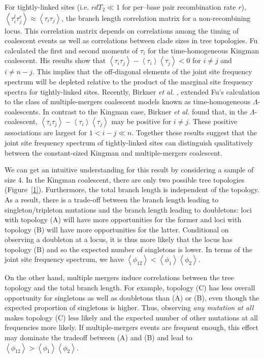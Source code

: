 \documentclass[11pt, letterpaper]{article}   	%
\newcommand{\Fig}[1]{Figure~\ref{#1}}
\newcommand{\E}[1]{\left<{#1}\right>}
\begin{document}
For tightly-linked sites (i.e. $rdT_2\ll1$ for per--base pair recombination rate $r$), $\E{\tau_i^l \tau_j^r} \approx \E{\tau_i \tau_j}$, the branch length correlation matrix for a non-recombining locus.
This correlation matrix depends on correlations among the timing of coalescent events as well as correlations between clade sizes in tree topologies.
Fu \cite{} calculated the first and second moments of $\tau_i$ for the time-homogeneous Kingman coalescent.
His results show that $\E{\tau_i \tau_j} - \E{\tau_i}\E{\tau_j} < 0$ for $i \neq j$ and $i \neq n-j$.
This implies that the off-diagonal elements of the joint site frequency spectrum will be depleted relative to the product of the marginal site frequency spectra for tightly-linked sites.
Recently, Birkner \textit{et al.} \cite{}, extended Fu's calculation to the class of multiple-mergers coalescent models known as time-homogeneous $\Lambda$-coalescents.
In contrast to the Kingman case, Birkner \textit{et al.} found that, in the $\Lambda$-coalescent, $\E{\tau_i \tau_j} - \E{\tau_i}\E{\tau_j}$ may be positive for $i \neq j$.
These positive associations are largest for $1 < i - j \ll n$.
Together these results suggest that the joint site frequency spectrum of tightly-linked sites can distinguish qualitatively between the constant-sized Kingman and multiple-mergers coalescent.

We can get an intuitive understanding for this result by considering a sample of size 4. In the Kingman coalescent, there are only two possible tree topologies (\Fig{1}).
Furthermore, the total branch length is independent of the topology.
As a result, there is a trade-off between the branch length leading to singleton/tripleton mutations and the branch length leading to doubletons: loci with topology (A) will have more opportunities for the former and loci with topology (B) will have more opportunities for the latter.
Conditional on observing a doubleton at a locus, it is thus more likely that the locus has topology (B) and so the expected number of singletons is lower.
In terms of the joint site frequency spectrum, we have $\E{\phi_{12}} < \E{\phi_{1}} \E{\phi_{2}}$.

On the other hand, multiple mergers induce correlations between the tree topology and the total branch length.
For example, topology (C) has less overall opportunity for singletons as well as doubletons than (A) or (B), even though the expected proportion of singletons is higher.
Thus, observing \emph{any mutation at all} makes topology (C) less likely and the expected number of other mutations at all frequencies more likely.
If multiple-mergers events are frequent enough, this effect may dominate the tradeoff between (A) and (B) and lead to $\E{\phi_{12}} > \E{\phi_{1}} \E{\phi_{2}}$.
\end{document}
